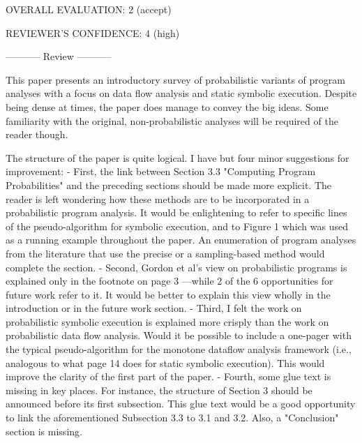 \documentclass[12pm]{article}
\begin{document}
{OVERALL EVALUATION: 2 (accept)

REVIEWER'S CONFIDENCE: 4 (high)

----------- Review -----------

This paper presents an introductory survey of probabilistic variants of program analyses with a focus on data flow analysis and static symbolic execution. Despite being dense at times, the paper does manage to convey the big ideas. Some familiarity with the original, non-probabilistic analyses will be required of the reader though. 

The structure of the paper is quite logical. I have but four minor suggestions for improvement:
- First, the link between Section 3.3 "Computing Program Probabilities" and the preceding sections should be made more explicit. The reader is left wondering how these methods are to be incorporated in a probabilistic program analysis. It would be enlightening to refer to specific lines of the pseudo-algorithm for symbolic execution, and to Figure 1 which was used as a running example throughout the paper. An enumeration of program analyses from the literature that use the precise or a sampling-based method would complete the section. 
- Second, Gordon et al's view on probabilistic programs is explained only in the footnote on page 3 ---while 2 of the 6 opportunities for future work refer to it. It would be better to explain this view wholly in the introduction or in the future work section. 
- Third, I felt the work on probabilistic symbolic execution is explained more crisply than the work on probabilistic data flow analysis. Would it be possible to include a one-pager with the typical pseudo-algorithm for the monotone dataflow analysis framework (i.e., analogous to what page 14 does for static symbolic execution). This would improve the clarity of the first part of the paper.
- Fourth, some glue text is missing in key places. For instance, the structure of Section 3 should be announced before its first subsection. This glue text would be a good opportunity to link the aforementioned Subsection 3.3 to 3.1 and 3.2.
Also, a "Conclusion" section is missing.

}
\end{document}
